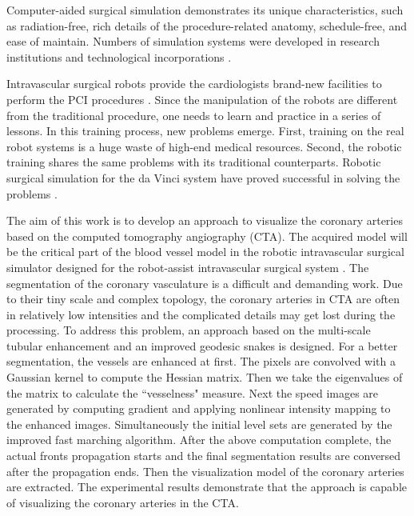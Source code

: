Computer-aided surgical simulation demonstrates its unique characteristics, such as radiation-free, rich details of the procedure-related anatomy, schedule-free, and ease of maintain.
Numbers of simulation systems were developed in research institutions \cite{Dawson1996DK,Wang1997ICard,Cotin2000ICTS} and technological incorporations \cite{CAEWeb,MenticeWeb,SimbionixWeb}.

Intravascular surgical robots provide the cardiologists brand-new facilities to perform the PCI procedures \cite{NIOBEWeb,HansenWeb,Beyar2006RNS,Smilowitz2012}.
Since the manipulation of the robots are different from the traditional procedure, one needs to learn and practice in a series of lessons.
In this training process, new problems emerge.
First, training on the real robot systems is a huge waste of high-end medical resources.
Second, the robotic training shares the same problems with its traditional counterparts.
Robotic surgical simulation for the da Vinci system have proved successful in solving the problems \cite{Liss2012,Kesavadas2011}.

The aim of this work is to develop an approach to visualize the coronary arteries based on the computed tomography angiography (CTA).
The acquired model will be the critical part of the blood vessel model in the robotic intravascular surgical simulator designed for the robot-assist intravascular surgical system \cite{Ji2011EMBC}.
The segmentation of the coronary vasculature is a difficult and demanding work.
Due to their tiny scale and complex topology, the coronary arteries in CTA are often in relatively low intensities and the complicated details may get lost during the processing.
To address this problem, an approach based on the multi-scale tubular enhancement and an improved geodesic snakes is designed.
For a better segmentation, the vessels are enhanced at first.
The pixels are convolved with a Gaussian kernel to compute the Hessian matrix.
Then we take the eigenvalues of the matrix to calculate the ``vesselness" measure.
Next the speed images are generated by computing gradient and applying nonlinear intensity mapping to the enhanced images.
Simultaneously the initial level sets are generated by the improved fast marching algorithm.
After the above computation complete, the actual fronts propagation starts and the final segmentation results are conversed after the propagation ends.
Then the visualization model of the coronary arteries are extracted.
The experimental results demonstrate that the approach is capable of visualizing the coronary arteries in the CTA.

